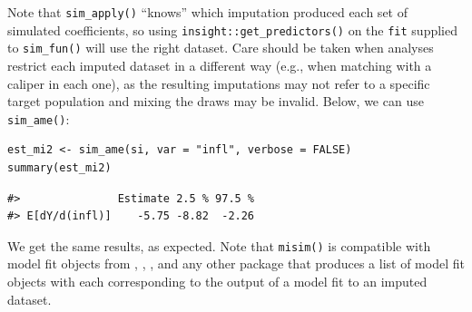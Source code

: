 Note that \texttt{sim\_apply()} ``knows'' which imputation produced each set of simulated coefficients, so using \texttt{insight::get\_predictors()} on the \texttt{fit} supplied to \texttt{sim\_fun()} will use the right dataset. Care should be taken when analyses restrict each imputed dataset in a different way (e.g., when matching with a caliper in each one), as the resulting imputations may not refer to a specific target population and mixing the draws may be invalid.
Below, we can use \texttt{sim\_ame()}:
\begin{verbatim}
est_mi2 <- sim_ame(si, var = "infl", verbose = FALSE)
summary(est_mi2)
\end{verbatim}
\begin{verbatim}
#>               Estimate 2.5 % 97.5 %
#> E[dY/d(infl)]    -5.75 -8.82  -2.26
\end{verbatim}
We get the same results, as expected.
Note that \texttt{misim()} is compatible with model fit objects from , , , and any other package that produces a list of model fit objects with each corresponding to the output of a model fit to an imputed dataset.
